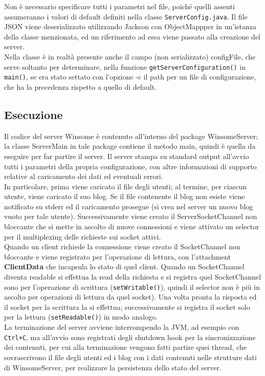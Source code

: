 Non è necessario specificare tutti i parametri nel file, poiché quelli assenti assumeranno i valori di default definiti nella classe \verb|ServerConfig.java|. Il file JSON viene deserializzato utilizzando Jackson con ObjectMappper in un'istanza della classe menzionata, ed un riferimento ad essa viene passato alla creazione del server.\\
Nella classe è in realtà presente anche il campo (non serializzato) configFile, che serve soltanto per determinare, nella funzione \verb|getServerConfiguration()| in \verb|main()|, se era stato settato con l'opzione -c il path per un file di configurazione, che ha la precedenza rispetto a quello di default.

\subsection{Esecuzione}
Il codice del server Winsome è contenuto all'interno del package WinsomeServer; la classe ServerMain in tale package contiene il metodo main, quindi è quella da eseguire per far partire il server. Il server stampa su standard output all'avvio tutti i parametri della propria configurazione, con altre informazioni di supporto relative al caricamento
dei dati ed eventuali errori.\\
In particolare, prima viene caricato il file degli utenti; al termine, per ciascun utente, viene caricato il suo blog. Se il file contenente il blog 
non esiste viene notificato su stderr ed il caricamento prosegue (si crea nel server un nuovo blog vuoto per tale utente). Successivamente viene creato il ServerSocketChannel
non bloccante che si mette in ascolto di nuove connessioni e viene attivato un selector per il multiplexing delle richieste sui socket attivi.\\
Quando un client richiede la connessione viene creato il SocketChannel non bloccante e viene registrato per l'operazione di lettura, con l'attachment \textbf{ClientData} che incapsula lo stato di quel client. Quando un SocketChannel diventa readable si effettua la read della richiesta e si registra quel SocketChannel sono per l'operazione di scrittura (\verb|setWritable()|), quindi il selector non è più in
ascolto per operazioni di lettura da quel socket). Una volta pronta la risposta ed il socket per la scrittura la si effettua; successivamente si registra il socket solo per la lettura (\verb|setReadable()|) in modo analogo.\\
La terminazione del server avviene interrompendo la JVM, ad esempio con \verb|Ctrl+C|, ma all'avvio sono registrati degli shutdown hook per la sincronizzazione dei contenuti,
per cui alla terminazione vengono fatti partire quei thread, che sovrascrivono il file degli utenti ed i blog con i dati contenuti nelle strutture dati di WinsomeServer, per realizzare
la persistenza dello stato del server.

